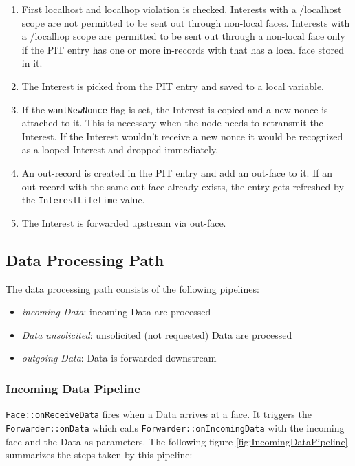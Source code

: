 \begin{enumerate}
\item First localhost and localhop violation is checked. Interests with a /localhost scope are not permitted to be sent out through non-local faces. Interests with a /localhop scope are permitted to be sent out through a non-local face only if the PIT entry has one or more in-records with that has a local face stored in it.
\item The Interest is picked from the PIT entry and saved to a local variable.
\item If the \texttt{wantNewNonce} flag is set, the Interest is copied and a new nonce is attached to it. This is necessary when the node needs to retransmit the Interest. If the Interest wouldn't receive a new nonce it would be recognized as a looped Interest and dropped immediately.
\item An out-record is created in the PIT entry and add an out-face to it. If an out-record with the same out-face already exists, the entry gets refreshed by the \texttt{InterestLifetime} value.
\item The Interest is forwarded upstream via out-face.
\end{enumerate}

\subsection{Data Processing Path}

The data processing path consists of the following pipelines:

\begin{itemize}
\item \emph{incoming Data}: incoming Data are processed
\item \emph{Data unsolicited}: unsolicited (not requested) Data are processed
\item \emph{outgoing Data}: Data is forwarded downstream
\end{itemize}

\subsubsection{Incoming Data Pipeline}

 \texttt{Face::onReceiveData} fires when a Data arrives at a face. It triggers the  \texttt{Forwarder::onData} which calls \texttt{Forwarder::onIncomingData} with the incoming face and the Data as parameters.
The following figure \ref{fig:IncomingDataPipeline} summarizes the steps taken by this pipeline:

